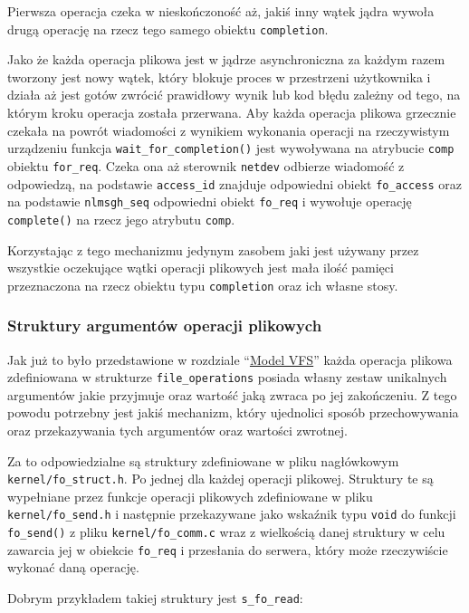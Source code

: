 \documentclass[10pt]{article}
\begin{document}
Pierwsza operacja czeka w nieskończoność aż, jakiś inny wątek jądra wywoła drugą operację na rzecz tego samego obiektu \texttt{completion}.

Jako że każda operacja plikowa jest w jądrze asynchroniczna za każdym razem tworzony jest nowy wątek, który blokuje proces w przestrzeni użytkownika i działa aż jest gotów zwrócić prawidłowy wynik lub kod błędu zależny od tego, na którym kroku operacja została przerwana. Aby każda operacja plikowa grzecznie czekała na powrót wiadomości z wynikiem wykonania operacji na rzeczywistym urządzeniu funkcja \texttt{wait\_for\_completion()} jest wywoływana na atrybucie \texttt{comp} obiektu \texttt{for\_req}. Czeka ona aż sterownik \texttt{netdev} odbierze wiadomość z odpowiedzą, na podstawie \texttt{access\_id} znajduje odpowiedni obiekt \texttt{fo\_access} oraz na podstawie \texttt{nlmsgh\_seq} odpowiedni obiekt \texttt{fo\_req} i wywołuje operację \texttt{complete()} na rzecz jego atrybutu \texttt{comp}.

Korzystając z tego mechanizmu jedynym zasobem jaki jest używany przez wszystkie oczekujące wątki operacji plikowych jest mała ilość pamięci przeznaczona na rzecz obiektu typu \texttt{completion} oraz ich własne stosy.

\subsubsection{Struktury argumentów operacji plikowych}

Jak już to było przedstawione w rozdziale ``\hyperref[model-vfs]{Model VFS}'' każda operacja plikowa zdefiniowana w strukturze \texttt{file\_operations} posiada własny zestaw unikalnych argumentów jakie przyjmuje oraz wartość jaką zwraca po jej zakończeniu. Z tego powodu potrzebny jest jakiś mechanizm, który ujednolici sposób przechowywania oraz przekazywania tych argumentów oraz wartości zwrotnej.

Za to odpowiedzialne są struktury zdefiniowane w pliku nagłówkowym \texttt{kernel/fo\_struct.h}. Po jednej dla każdej operacji plikowej.  Struktury te są wypełniane przez funkcje operacji plikowych zdefiniowane w pliku \texttt{kernel/fo\_send.h} i następnie przekazywane jako wskaźnik typu \texttt{void} do funkcji \texttt{fo\_send()} z pliku \texttt{kernel/fo\_comm.c} wraz z wielkością danej struktury w celu zawarcia jej w obiekcie \texttt{fo\_req} i przesłania do serwera, który może rzeczywiście wykonać daną operację.

Dobrym przykładem takiej struktury jest \texttt{s\_fo\_read}:
\end{document}
